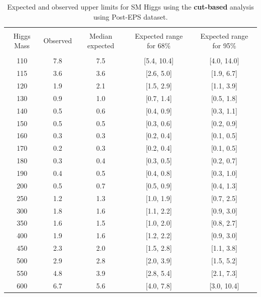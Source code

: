 \begin{table}[hbp!]
\begin{center}
\begin{tabular}{c c c c c}
\hline
\vspace{-3mm} && \\
 Higgs Mass   & Observed & Median expected & Expected range for 68\% & Expected range for 95\%   \\
\vspace{-3mm} && \\
\hline
110 & 7.8 & 7.5 & [5.4, 10.4] & [4.0, 14.0] \\
115 & 3.6 & 3.6 & [2.6, 5.0] & [1.9, 6.7] \\
120 & 1.9 & 2.1 & [1.5, 2.9] & [1.1, 3.9] \\
130 & 0.9 & 1.0 & [0.7, 1.4] & [0.5, 1.8] \\
140 & 0.5 & 0.6 & [0.4, 0.9] & [0.3, 1.1] \\
150 & 0.5 & 0.5 & [0.3, 0.6] & [0.2, 0.9] \\
160 & 0.3 & 0.3 & [0.2, 0.4] & [0.1, 0.5] \\
170 & 0.2 & 0.3 & [0.2, 0.4] & [0.1, 0.5] \\
180 & 0.3 & 0.4 & [0.3, 0.5] & [0.2, 0.7] \\
190 & 0.4 & 0.5 & [0.4, 0.8] & [0.3, 1.0] \\
200 & 0.5 & 0.7 & [0.5, 0.9] & [0.4, 1.3] \\
250 & 1.2 & 1.3 & [1.0, 1.9] & [0.7, 2.5] \\
300 & 1.8 & 1.6 & [1.1, 2.2] & [0.9, 3.0] \\
350 & 1.6 & 1.5 & [1.0, 2.0] & [0.8, 2.7] \\
400 & 1.9 & 1.6 & [1.2, 2.2] & [0.9, 3.0] \\
450 & 2.3 & 2.0 & [1.5, 2.8] & [1.1, 3.8] \\
500 & 2.9 & 2.8 & [2.0, 3.9] & [1.5, 5.2] \\
550 & 4.8 & 3.9 & [2.8, 5.4] & [2.1, 7.3] \\
600 & 6.7 & 5.6 & [4.0, 7.8] & [3.0, 10.4] \\
\hline
\end{tabular}
\caption{Expected and observed upper limits for SM Higgs using the
  {\bf cut-based} analysis using Post-EPS dataset.}
\label{tab:cutbase_uls_posteps}
\end{center}
\end{table}


